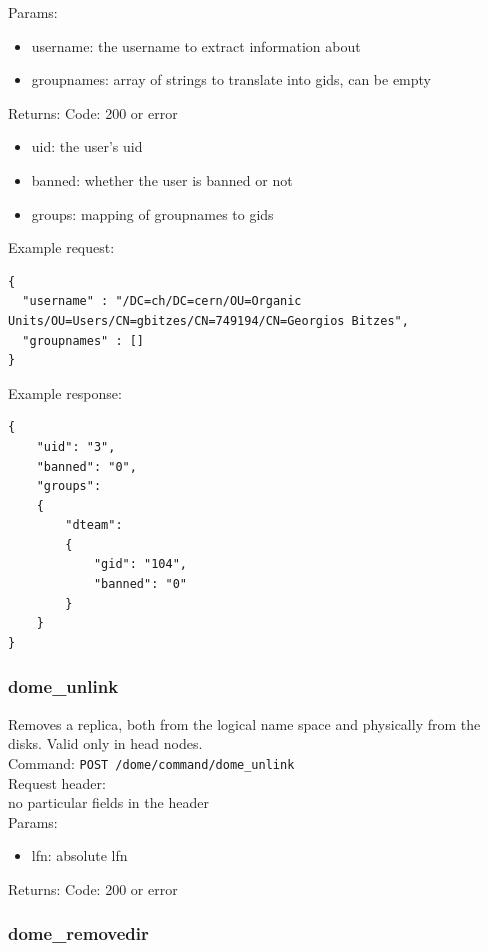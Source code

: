 \documentclass[a4paper,10pt]{scrreprt}
\begin{document}
Params:
\begin{itemize}
 \item username: the username to extract information about
 \item groupnames: array of strings to translate into gids, can be empty
\end{itemize}

Returns:
Code: 200 or error
\begin{itemize}
 \item uid: the user's uid
 \item banned: whether the user is banned or not
 \item groups: mapping of groupnames to gids
\end{itemize}

Example request:\\
\begin{lstlisting}
{
  "username" : "/DC=ch/DC=cern/OU=Organic Units/OU=Users/CN=gbitzes/CN=749194/CN=Georgios Bitzes",
  "groupnames" : []
}
\end{lstlisting}

Example response:\\
\begin{lstlisting}
{
    "uid": "3",
    "banned": "0",
    "groups":
    {
        "dteam":
        {
            "gid": "104",
            "banned": "0"
        }
    }
}
\end{lstlisting}


\subsubsection{dome\_unlink}

Removes a replica, both from the logical name space and physically from the disks. Valid only in head nodes.\\
Command:
\lstinline"POST /dome/command/dome_unlink"\\

Request header:\\
no particular fields in the header\\

Params:
\begin{itemize}
 \item lfn: absolute lfn
\end{itemize}

Returns:
Code: 200 or error





\subsubsection{dome\_removedir}
\end{document}
